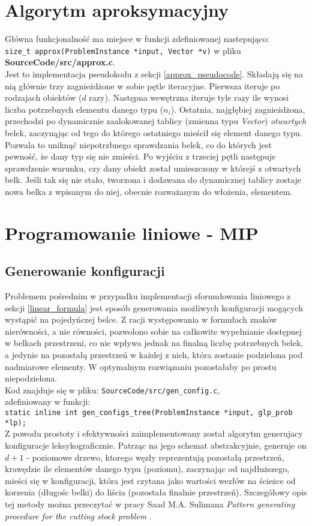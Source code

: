 \section{Algorytm aproksymacyjny}
Główna funkcjonalność ma miejsce w funkcji zdefiniowanej nastepująco: \\ \verb|size_t approx(ProblemInstance *input, Vector *v)| w pliku \textbf{SourceCode/src/approx.c}. \\
Jest to implementacja pseudokodu z sekcji \ref{approx_pseudocode}.
Składają się na nią głównie trzy zagnieżdżone w sobie pętle iteracyjne.
Pierwsza iteruje po rodzajach obiektów ($d$ razy).
Następna wewętrzna iteruje tyle razy ile wynosi liczba potrzebnych elementu danego typu ($n_i$).
Ostatnia, najgłębiej zagnieżdżona, przechodzi po dynamicznie zaalokowanej tablicy (zmienna typu \textit{Vector}) \textit{otwartych} belek, zaczynąjąc od tego do którego ostatniego mieścił się element danego typu. Pozwala to uniknąć niepotrzbnego sprawdzania belek, co do których jest pewność, że dany typ się nie zmieści. 
Po wyjściu z trzeciej pętli następuje sprawdzenie warunku, czy dany obiekt został umieszczony w którejś z otwartych belk. Jeśli tak się nie stało, tworzona i dodawana do dynamicznej tablicy zostaje nowa belka z wpisanym do niej, obecnie rozważanym do włożenia, elementem.

\section{Programowanie liniowe - MIP}
\subsection{Generowanie konfiguracji}
Problemem pośrednim w przypadku implementacji sformułowania liniowego z sekcji \ref{linear_formula} jest sposób generowania możliwych konfiguracji mogących wystąpić na pojedyńczej belce.
Z racji występowania w formułach znaków nierówności, a nie równości, pozwolono sobie na całkowite wypełnianie dostępnej w belkach przestrzeni, co nie wpływa jednak na finalną liczbę potrzebnych belek, a jedynie na pozostałą przestrzeń w każdej z nich, która zostanie podzielona pod nadmiarowe elementy. W optymalnym rozwiązaniu pozostałaby po prostu niepodzielona.\\
Kod znajduje się w pliku: \verb|SourceCode/src/gen_config.c|,  \\ zdefiniowany w funkcji: \\ \verb|static inline int gen_configs_tree(ProblemInstance *input, glp_prob *lp);| \\
Z powodu prostoty i efektywności zaimplementowany został algorytm generujacy konfiguracje leksykograficznie. Patrząc na jego schemat abstrakcyjnie, generuje on $d + 1$ - poziomowe drzewo, ktorego węzły reprezentują pozostałą przestrzeń, krawędzie ile elementów danego typu (poziomu), zaczynając od najdłuższego, mieści się w konfiguracji, która jest czytana jako wartości wezłów na ścieżce od korzenia (długośc belki) do liścia (pozostała finalnie przestrzeń).
Szczegółowy opis tej metody można przeczytać w pracy Saad M.A. Sulimana \textit{Pattern generating procedure for the cutting stock problem} \cite{GEN_CONFIGS}. \\

